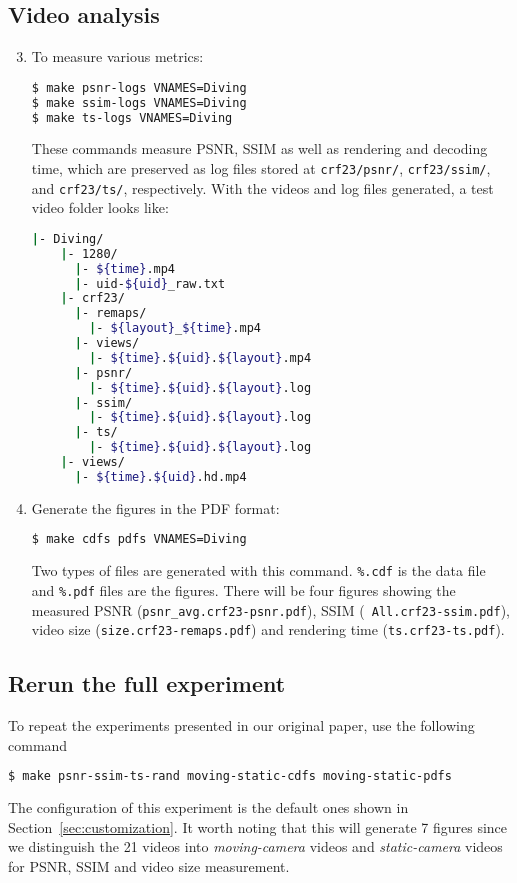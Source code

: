 \subsection{Video analysis}
\begin{enumerate}[leftmargin=*]
  \setcounter{enumi}{2}
\item To measure various metrics:
\begin{lstlisting}[language=bash, numbers=none,  morekeywords={make, git, clone}]
$ make psnr-logs VNAMES=Diving
$ make ssim-logs VNAMES=Diving
$ make ts-logs VNAMES=Diving
\end{lstlisting}
    These commands measure PSNR, SSIM as well as rendering and decoding time, which are preserved as log files stored at
    {\tt crf23/psnr/}, {\tt crf23/ssim/}, and {\tt crf23/ts/}, respectively. With the videos and log files generated, a
    test video folder looks like:
\begin{lstlisting}[language=bash, numbers=none, frame=none]
  |- Diving/
    |- 1280/
      |- ${time}.mp4
      |- uid-${uid}_raw.txt
    |- crf23/
      |- remaps/
        |- ${layout}_${time}.mp4
      |- views/
        |- ${time}.${uid}.${layout}.mp4
      |- psnr/
        |- ${time}.${uid}.${layout}.log
      |- ssim/
        |- ${time}.${uid}.${layout}.log
      |- ts/
        |- ${time}.${uid}.${layout}.log
    |- views/
      |- ${time}.${uid}.hd.mp4
\end{lstlisting}

\item Generate the figures in the PDF format:
\begin{lstlisting}[language=bash, numbers=none]
$ make cdfs pdfs VNAMES=Diving
\end{lstlisting}
Two types of files are generated with this command. {\tt \%.cdf} is the data file and {\tt \%.pdf} files are the
figures. There will be four figures showing the measured PSNR ({\tt psnr\_avg.crf23-psnr.pdf}), SSIM ({\tt
  All.crf23-ssim.pdf}), video size ({\tt size.crf23-remaps.pdf}) and rendering time ({\tt ts.crf23-ts.pdf}).

\end{enumerate}


\subsection{Rerun the full experiment}

To repeat the experiments presented in our original paper, use the following command
\begin{lstlisting}[language=bash, numbers=none]
  $ make psnr-ssim-ts-rand moving-static-cdfs moving-static-pdfs
\end{lstlisting}
The configuration of this experiment is the default ones shown in Section~\ref{sec:customization}. It worth noting that
this will generate 7 figures since we distinguish the 21 videos into {\it moving-camera} videos and {\it static-camera}
videos for PSNR, SSIM and video size measurement.



